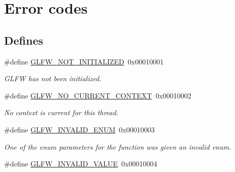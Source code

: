 \hypertarget{group__errors}{\section{\-Error codes}
\label{group__errors}
}
\subsection*{\-Defines}
\begin{DoxyCompactItemize}
\item 
\hypertarget{group__errors_ga2374ee02c177f12e1fa76ff3ed15e14a}{\#define \hyperlink{group__errors_ga2374ee02c177f12e1fa76ff3ed15e14a}{\-G\-L\-F\-W\-\_\-\-N\-O\-T\-\_\-\-I\-N\-I\-T\-I\-A\-L\-I\-Z\-E\-D}~0x00010001}\label{group__errors_ga2374ee02c177f12e1fa76ff3ed15e14a}

\begin{DoxyCompactList}\small\item\em \-G\-L\-F\-W has not been initialized. \end{DoxyCompactList}\item 
\hypertarget{group__errors_gaa8290386e9528ccb9e42a3a4e16fc0d0}{\#define \hyperlink{group__errors_gaa8290386e9528ccb9e42a3a4e16fc0d0}{\-G\-L\-F\-W\-\_\-\-N\-O\-\_\-\-C\-U\-R\-R\-E\-N\-T\-\_\-\-C\-O\-N\-T\-E\-X\-T}~0x00010002}\label{group__errors_gaa8290386e9528ccb9e42a3a4e16fc0d0}

\begin{DoxyCompactList}\small\item\em \-No context is current for this thread. \end{DoxyCompactList}\item 
\hypertarget{group__errors_ga76f6bb9c4eea73db675f096b404593ce}{\#define \hyperlink{group__errors_ga76f6bb9c4eea73db675f096b404593ce}{\-G\-L\-F\-W\-\_\-\-I\-N\-V\-A\-L\-I\-D\-\_\-\-E\-N\-U\-M}~0x00010003}\label{group__errors_ga76f6bb9c4eea73db675f096b404593ce}

\begin{DoxyCompactList}\small\item\em \-One of the enum parameters for the function was given an invalid enum. \end{DoxyCompactList}\item 
\hypertarget{group__errors_gaaf2ef9aa8202c2b82ac2d921e554c687}{\#define \hyperlink{group__errors_gaaf2ef9aa8202c2b82ac2d921e554c687}{\-G\-L\-F\-W\-\_\-\-I\-N\-V\-A\-L\-I\-D\-\_\-\-V\-A\-L\-U\-E}~0x00010004}\label{group__errors_gaaf2ef9aa8202c2b82ac2d921e554c687}


\end{DoxyCompactItemize}
